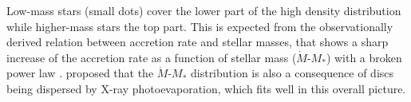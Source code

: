 \documentclass[fleqn,usenatbib]{mnras}
\begin{document}
Low-mass stars (small dots) cover the lower part of the high density distribution while higher-mass stars the top part. This is expected from the observationally derived relation between accretion rate and stellar masses, that shows a sharp increase of the accretion rate as a function of stellar mass ($\dot{M}$-$M_*$) with a broken power law \citep[e.g.][]{Alcala2017}. \citet{Ercolano2014} proposed that the $\dot{M}$-$M_*$ distribution is also a consequence of discs being dispersed by X-ray photoevaporation, which fits well in this overall picture. 
\end{document}
